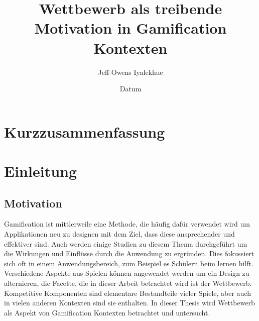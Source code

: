 %
% 
% 
%



\renewcommand{\Thema}{%
                        Wettbewerb als treibende Motivation in Gamification Kontexten}





\title{\Thema}
\author{Jeff-Owens Iyalekhue}
\date{Datum}

%
\tableofcontents %

\chapter{Kurzzusammenfassung}

\chapter{Einleitung}
\section{Motivation}
Gamification ist mittlerweile eine Methode, die häufig dafür verwendet wird um Applikationen neu zu designen mit dem Ziel, dass diese ansprechender und effektiver sind. Auch werden einige Studien zu diesem Thema durchgeführt um die Wirkungen und Einflüsse durch die Anwendung zu ergründen. Dies fokussiert sich oft in einem Anwendungsbereich, zum Beispiel es Schülern beim lernen hilft. Verschiedene Aspekte aus Spielen können angewendet werden um ein Design zu alternieren, die Facette, die in dieser Arbeit betrachtet wird ist der Wettbewerb.
Kompetitive Komponenten sind elementare Bestandteile vieler Spiele, aber auch in vielen anderen Kontexten sind sie enthalten.
In dieser Thesis wird Wettbewerb als Aspekt von Gamification Kontexten betrachtet und untersucht.
